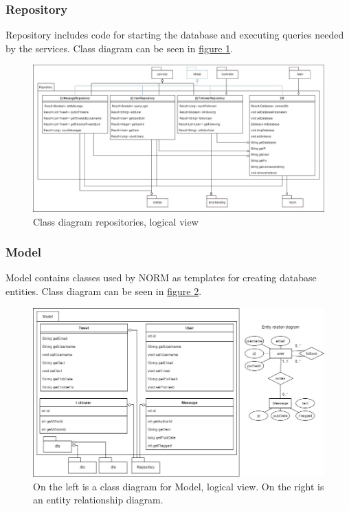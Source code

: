 \subsubsection{Repository}
Repository includes code for starting the database and executing queries needed by the services. Class diagram can be seen in \hyperref[fig:classDiagramRepository]{figure \ref{fig:classDiagramRepository}}.
\begin{figure}[H]
    \centering
    \hspace*{-0.5in}
    \includegraphics[scale=0.4]{images/class_diagram_repository.jpg}
    \caption{Class diagram repositories, logical view}
    \label{fig:classDiagramRepository}
\end{figure}

\subsubsection{Model}
Model contains classes used by NORM as templates for creating database entities. Class diagram can be seen in \hyperref[fig:classDiagramModel]{figure \ref{fig:classDiagramModel}}.
\begin{figure}[H]
    \centering
    \includegraphics[scale=0.5]{images/class_diagram_model.jpg}
    \caption{On the left is a class diagram for Model, logical view. On the right is an entity relationship diagram.}
    \label{fig:classDiagramModel}
\end{figure}

